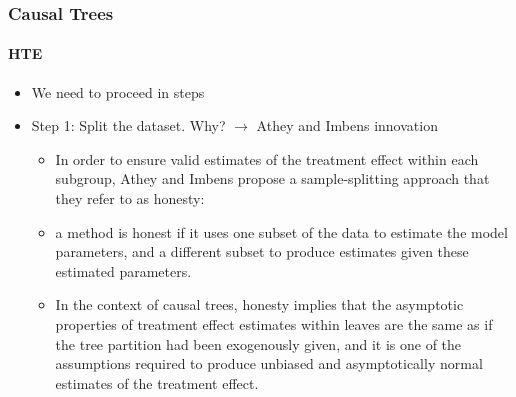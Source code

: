 \documentclass[
  shownotes,
  xcolor={svgnames},
  hyperref={colorlinks,citecolor=DarkBlue,linkcolor=DarkRed,urlcolor=DarkBlue}
  , aspectratio=169]{beamer}
\begin{document}
\begin{frame}[fragile]
\frametitle{Causal Trees}
\framesubtitle{HTE}

\begin{itemize}
 \item We need to proceed in steps
 \item Step 1: Split the dataset. Why? $\rightarrow$ Athey and Imbens innovation
 \begin{itemize}
  \item In order to ensure valid estimates of the treatment effect within each subgroup, Athey and Imbens propose a sample-splitting approach that they refer to as honesty: 
  \item a method is honest if it uses one subset of the data to estimate the model parameters, and a different subset to produce estimates given these estimated parameters. 
  \item In the context of causal trees, honesty implies that the asymptotic properties of treatment effect estimates within leaves are the same as if the tree partition had been exogenously given, and it is one of the assumptions required to produce unbiased and asymptotically normal estimates of the treatment effect.
 
 \end{itemize}
\end{itemize}

\end{frame}
\end{document}
